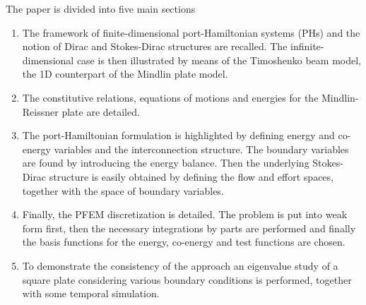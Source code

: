 \documentclass[preprint,12pt]{elsarticle}
\newcommand{\RevOne}[1]{\textcolor{blue!80!black}{#1}}
\newcommand{\RevTwo}[1]{\textcolor{red!80!black}{#1}}
\begin{document}
	The paper is divided into \RevTwo{five} main sections 
	\begin{enumerate}
		\item The framework of finite-dimensional port-Hamiltonian systems (PHs) and the notion of Dirac and Stokes-Dirac structures are recalled. The infinite-dimensional case is then illustrated by means of the Timoshenko beam model, the 1D counterpart of the Mindlin plate model.
		\item \RevOne{The constitutive relations, equations of motions and energies for the Mindlin-Reissner plate are detailed.}
		\item The port-Hamiltonian formulation is highlighted by defining energy and co-energy variables and the interconnection structure. The boundary variables are found by introducing the energy balance. Then the underlying Stokes-Dirac structure is easily obtained by defining the flow and effort spaces, together with the space of boundary variables.
		\item Finally, the PFEM discretization is detailed. The problem is put into weak form first, then the necessary integrations by parts are performed and finally the basis functions for the energy, co-energy and test functions are chosen.
		\item \RevTwo{To demonstrate the consistency of the approach an eigenvalue study of a square plate considering various boundary conditions is performed, together with some temporal simulation. } 
	\end{enumerate}
\end{document}
